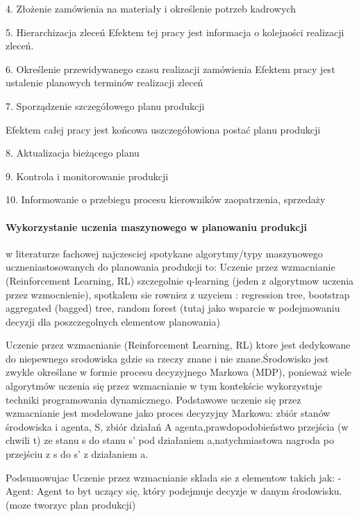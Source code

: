 4. Złożenie zamówienia na materiały i określenie potrzeb kadrowych

5. Hierarchizacja zleceń
Efektem tej pracy jest informacja o kolejności realizacji zleceń.

6. Określenie przewidywanego czasu realizacji zamówienia
 Efektem pracy jest ustalenie planowych terminów realizacji zleceń
 
7. Sporządzenie szczegółowego planu produkcji

 Efektem całej pracy jest końcowa uszczegółowiona postać planu produkcji
 
8. Aktualizacja bieżącego planu

9. Kontrola i monitorowanie produkcji

10. Informowanie o przebiegu procesu kierowników zaopatrzenia, sprzedaży

 
\cite{encp2023}\cite{pl2023}\cite{pla2023}\cite{des2023}\cite{wikm2023}\cite{wikmr2023}\cite{wikc2023}
\newpage
\paragraph{Wykorzystanie uczenia maszynowego w planowaniu produkcji}
 \vspace{\baselineskip} 
w literaturze fachowej najczesciej spotykane algorytmy/typy maszynowego uczneniastosowanych do planowania produkcji to: Uczenie przez wzmacnianie (Reinforcement Learning, RL) szczegolnie q-learning (jeden z algorytmow uczenia przez wzmocnienie), spotkalem sie rowniez z uzyciem : regression tree, bootstrap aggregated (bagged) tree, random forest (tutaj jako wsparcie w podejmowaniu decyzji dla poszczegolnych elementow planowania)

Uczenie przez wzmacnianie (Reinforcement Learning, RL) ktore jest dedykowane do niepewnego srodowiska gdzie sa rzeczy znane i nie znane.Środowisko jest zwykle określane w formie procesu decyzyjnego Markowa (MDP), ponieważ wiele algorytmów uczenia się przez wzmacnianie w tym kontekście wykorzystuje techniki programowania dynamicznego.
Podstawowe uczenie się przez wzmacnianie jest modelowane jako proces decyzyjny Markowa:
   zbiór stanów środowiska i agenta, S, zbiór działań A agenta,prawdopodobieństwo przejścia (w chwili  t) ze stanu s  do stanu  s' pod działaniem  a,natychmiastowa nagroda po przejściu z s do  s' z działaniem  a.
 

Podsumowujac Uczenie przez wzmacnianie sklada sie z elementow takich jak:
- Agent: Agent to byt uczący się, który podejmuje decyzje w danym środowisku. (moze tworzyc plan produkcji)

